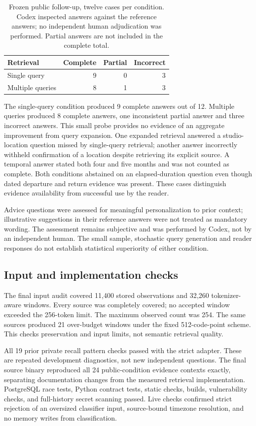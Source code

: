 \begin{table}[htbp]
\centering
\begin{tabular}{lrrr}
\toprule
Retrieval & Complete & Partial & Incorrect\\
\midrule
Single query & 9 & 0 & 3\\
Multiple queries & 8 & 1 & 3\\
\bottomrule
\end{tabular}
\caption{Frozen public follow-up, twelve cases per condition. Codex inspected answers against the reference answers; no independent human adjudication was performed. Partial answers are not included in the complete total.}
\label{tab:retrieval-followup}
\end{table}
The single-query condition produced 9 complete answers out of 12. Multiple queries produced 8 complete answers, one inconsistent partial answer and three incorrect answers. This small probe provides no evidence of an aggregate improvement from query expansion. One expanded retrieval answered a studio-location question missed by single-query retrieval; another answer incorrectly withheld confirmation of a location despite retrieving its explicit source. A temporal answer stated both four and five months and was not counted as complete. Both conditions abstained on an elapsed-duration question even though dated departure and return evidence was present. These cases distinguish evidence availability from successful use by the reader.

Advice questions were assessed for meaningful personalization to prior context; illustrative suggestions in their reference answers were not treated as mandatory wording. The assessment remains subjective and was performed by Codex, not by an independent human. The small sample, stochastic query generation and reader responses do not establish statistical superiority of either condition.

\subsection{Input and implementation checks}
The final input audit covered 11,400 stored observations and 32,260 tokenizer-aware windows. Every source was completely covered; no accepted window exceeded the 256-token limit. The maximum observed count was 254. The same sources produced 21 over-budget windows under the fixed 512-code-point scheme. This checks preservation and input limits, not semantic retrieval quality.

All 19 prior private recall pattern checks passed with the strict adapter. These are repeated development diagnostics, not new independent questions. The final source binary reproduced all 24 public-condition evidence contexts exactly, separating documentation changes from the measured retrieval implementation. PostgreSQL race tests, Python contract tests, static checks, builds, vulnerability checks, and full-history secret scanning passed. Live checks confirmed strict rejection of an oversized classifier input, source-bound timezone resolution, and no memory writes from classification.

